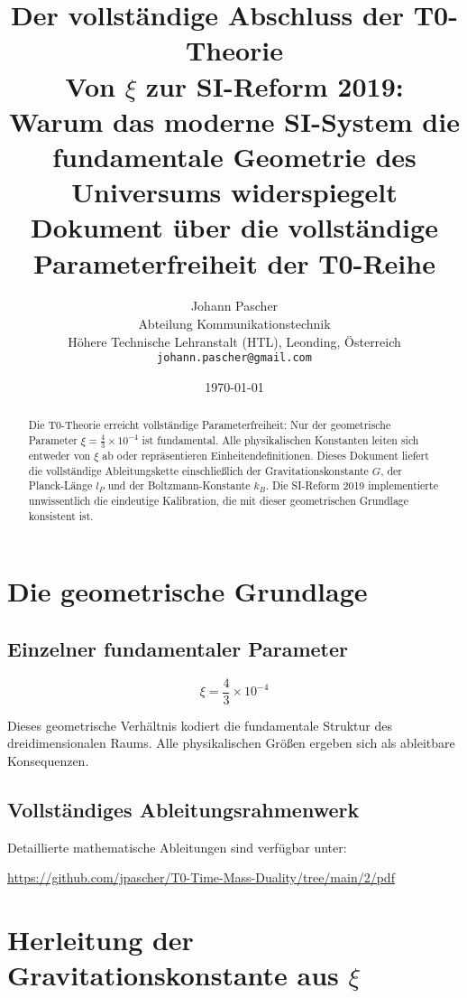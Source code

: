 \documentclass[12pt,a4paper]{article}
\title{\textbf{Der vollst{\"a}ndige Abschluss der T0-Theorie}\\[0.5cm]
	\large Von $\xi$ zur SI-Reform 2019:\\
	Warum das moderne SI-System die fundamentale Geometrie des Universums widerspiegelt\\[0.3cm]
	\normalsize Dokument {\"u}ber die vollst{\"a}ndige Parameterfreiheit der T0-Reihe}
\author{Johann Pascher\\
	Abteilung Kommunikationstechnik\\
	H{\"o}here Technische Lehranstalt (HTL), Leonding, {\"O}sterreich\\
	\texttt{johann.pascher@gmail.com}}
\date{\today}
\begin{document}
	
	\maketitle
	
	\begin{abstract}
		Die T0-Theorie erreicht vollst{\"a}ndige Parameterfreiheit: Nur der geometrische Parameter $\xi = \frac{4}{3} \times 10^{-4}$ ist fundamental. Alle physikalischen Konstanten leiten sich entweder von $\xi$ ab oder repr{\"a}sentieren Einheitendefinitionen. Dieses Dokument liefert die vollst{\"a}ndige Ableitungskette einschlie{\ss}lich der Gravitationskonstante $G$, der Planck-L{\"a}nge $l_P$ und der Boltzmann-Konstante $k_B$. Die SI-Reform 2019 implementierte unwissentlich die eindeutige Kalibration, die mit dieser geometrischen Grundlage konsistent ist.
	\end{abstract}
	
	\tableofcontents
	\newpage
	
	\section{Die geometrische Grundlage}
	
	\subsection{Einzelner fundamentaler Parameter}
	
	\begin{equation}
		\boxed{\xi = \frac{4}{3} \times 10^{-4}}
	\end{equation}
	
	Dieses geometrische Verh{\"a}ltnis kodiert die fundamentale Struktur des dreidimensionalen Raums. Alle physikalischen Gr{\"o}{\ss}en ergeben sich als ableitbare Konsequenzen.
	
	\subsection{Vollst{\"a}ndiges Ableitungsrahmenwerk}
	
	Detaillierte mathematische Ableitungen sind verf{\"u}gbar unter:
	
	\begin{center}
		\url{https://github.com/jpascher/T0-Time-Mass-Duality/tree/main/2/pdf}
	\end{center}
	
	\section{Herleitung der Gravitationskonstante aus $\xi$}
	
\end{document}
